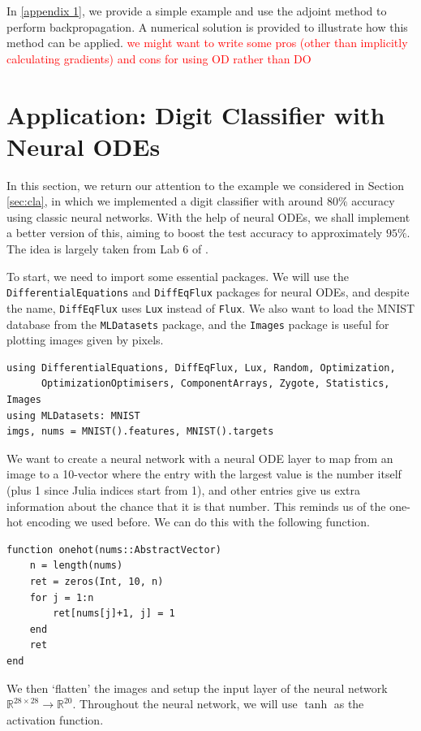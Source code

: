 \documentclass[a4paper,11pt,titlepage]{article}
\theoremstyle{definition}
\theoremstyle{plain}
\theoremstyle{remark}
\begin{document}
In \ref{appendix 1}, we provide a simple example and use the adjoint method to perform backpropagation. A numerical solution is provided to illustrate how this method can be applied.
\textcolor{red}{we might want to write some pros (other than implicitly calculating gradients) and cons for using OD rather than DO}

\pagebreak
\section{Application: Digit Classifier with Neural ODEs}
\label{sec:app}

In this section, we return our attention to the example we considered in Section \ref{sec:cla}, in which we implemented a digit classifier with around $80\%$ accuracy using classic neural networks. With the help of neural ODEs, we shall implement a better version of this, aiming to boost the test accuracy to approximately $95\%$. The idea is largely taken from Lab 6 of \cite{SciMLSANUM2024}.

To start, we need to import some essential packages. We will use the \verb|DifferentialEquations| and \verb|DiffEqFlux| packages for neural ODEs, and despite the name, \verb|DiffEqFlux| uses \verb|Lux| instead of \verb|Flux|. We also want to load the MNIST database from the \verb|MLDatasets| package, and the \verb|Images| package is useful for plotting images given by pixels.

\begin{verbatim}
using DifferentialEquations, DiffEqFlux, Lux, Random, Optimization,
      OptimizationOptimisers, ComponentArrays, Zygote, Statistics, Images
using MLDatasets: MNIST
imgs, nums = MNIST().features, MNIST().targets
\end{verbatim}

We want to create a neural network with a neural ODE layer to map from an image to a 10-vector where the entry with the largest value is the number itself (plus 1 since Julia indices start from 1), and other entries give us extra information about the chance that it is that number. This reminds us of the one-hot encoding we used before. We can do this with the following function.

\begin{verbatim}
function onehot(nums::AbstractVector)
    n = length(nums)
    ret = zeros(Int, 10, n)
    for j = 1:n
        ret[nums[j]+1, j] = 1
    end
    ret
end
\end{verbatim}

We then ‘flatten’ the images and setup the input layer of the neural network $\mathbb{R}^{28\times28}\rightarrow\mathbb{R}^{20}$. Throughout the neural network, we will use $\tanh$ as the activation function.
\end{document}

